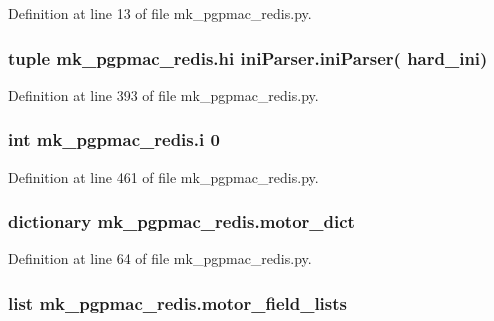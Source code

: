 Definition at line 13 of file mk\-\_\-pgpmac\-\_\-redis.\-py.

\hypertarget{namespacemk__pgpmac__redis_af0e472a4df25fc5c1660ef07226689a8}{
\subsubsection[{hi}]{\setlength{\rightskip}{0pt plus 5cm}tuple mk\-\_\-pgpmac\-\_\-redis.\-hi {\bf ini\-Parser.\-ini\-Parser}( {\bf hard\-\_\-ini})}}\label{namespacemk__pgpmac__redis_af0e472a4df25fc5c1660ef07226689a8}


Definition at line 393 of file mk\-\_\-pgpmac\-\_\-redis.\-py.

\hypertarget{namespacemk__pgpmac__redis_afa643a23a5984fe44c2182ada3dfa401}{
\subsubsection[{i}]{\setlength{\rightskip}{0pt plus 5cm}int mk\-\_\-pgpmac\-\_\-redis.\-i 0}}\label{namespacemk__pgpmac__redis_afa643a23a5984fe44c2182ada3dfa401}


Definition at line 461 of file mk\-\_\-pgpmac\-\_\-redis.\-py.

\hypertarget{namespacemk__pgpmac__redis_ad8583d4fe88c4c98af73d2858c51c660}{
\subsubsection[{motor\-\_\-dict}]{\setlength{\rightskip}{0pt plus 5cm}dictionary mk\-\_\-pgpmac\-\_\-redis.\-motor\-\_\-dict}}\label{namespacemk__pgpmac__redis_ad8583d4fe88c4c98af73d2858c51c660}


Definition at line 64 of file mk\-\_\-pgpmac\-\_\-redis.\-py.

\hypertarget{namespacemk__pgpmac__redis_a7228dc1b6ecec376538db1efe8c05ffb}{
\subsubsection[{motor\-\_\-field\-\_\-lists}]{\setlength{\rightskip}{0pt plus 5cm}list mk\-\_\-pgpmac\-\_\-redis.\-motor\-\_\-field\-\_\-lists}}\label{namespacemk__pgpmac__redis_a7228dc1b6ecec376538db1efe8c05ffb}


